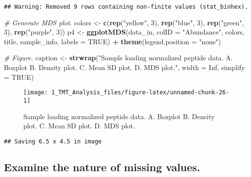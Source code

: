 \documentclass[]{article}
\newenvironment{Shaded}{\begin{snugshade}}{\end{snugshade}}
\newcommand{\KeywordTok}[1]{\textcolor[rgb]{0.13,0.29,0.53}{\textbf{#1}}}
\newcommand{\DataTypeTok}[1]{\textcolor[rgb]{0.13,0.29,0.53}{#1}}
\newcommand{\DecValTok}[1]{\textcolor[rgb]{0.00,0.00,0.81}{#1}}
\newcommand{\StringTok}[1]{\textcolor[rgb]{0.31,0.60,0.02}{#1}}
\newcommand{\CommentTok}[1]{\textcolor[rgb]{0.56,0.35,0.01}{\textit{#1}}}
\newcommand{\OtherTok}[1]{\textcolor[rgb]{0.56,0.35,0.01}{#1}}
\newcommand{\OperatorTok}[1]{\textcolor[rgb]{0.81,0.36,0.00}{\textbf{#1}}}
\newcommand{\NormalTok}[1]{#1}
\begin{document}
\begin{verbatim}
## Warning: Removed 9 rows containing non-finite values (stat_binhex).
\end{verbatim}

\begin{Shaded}
\begin{Highlighting}[]
\CommentTok{# Generate MDS plot.}
\NormalTok{colors <-}\StringTok{ }\KeywordTok{c}\NormalTok{(}\KeywordTok{rep}\NormalTok{(}\StringTok{"yellow"}\NormalTok{, }\DecValTok{3}\NormalTok{), }\KeywordTok{rep}\NormalTok{(}\StringTok{"blue"}\NormalTok{, }\DecValTok{3}\NormalTok{), }\KeywordTok{rep}\NormalTok{(}\StringTok{"green"}\NormalTok{, }\DecValTok{3}\NormalTok{), }\KeywordTok{rep}\NormalTok{(}\StringTok{"purple"}\NormalTok{, }\DecValTok{3}\NormalTok{))}
\NormalTok{p4 <-}\StringTok{ }\KeywordTok{ggplotMDS}\NormalTok{(data_in, }\DataTypeTok{colID =} \StringTok{"Abundance"}\NormalTok{, colors, title, sample_info, }\DataTypeTok{labels =} \OtherTok{TRUE}\NormalTok{) }\OperatorTok{+}
\StringTok{  }\KeywordTok{theme}\NormalTok{(}\DataTypeTok{legend.position =} \StringTok{"none"}\NormalTok{)}

\CommentTok{# Figure.}
\NormalTok{caption <-}\StringTok{ }\KeywordTok{strwrap}\NormalTok{(}\StringTok{"Sample loading normalized peptide data. A. Boxplot B. Density plot. }
\StringTok{                   C. Mean SD plot. D. MDS plot."}\NormalTok{, }\DataTypeTok{width =} \OtherTok{Inf}\NormalTok{, }\DataTypeTok{simplify =} \OtherTok{TRUE}\NormalTok{)}
\end{Highlighting}
\end{Shaded}

\begin{figure}

{\centering \texttt{[image: 1\_TMT\_Analysis\_files/figure-latex/unnamed-chunk-26-1]} 

}

\caption{Sample loading normalized peptide data. A. Boxplot B. Density plot.  C. Mean SD plot. D. MDS plot.}\label{fig:unnamed-chunk-26}
\end{figure}

\begin{verbatim}
## Saving 6.5 x 4.5 in image
\end{verbatim}

\subsection{Examine the nature of missing
values.}\label{examine-the-nature-of-missing-values.}
\end{document}
